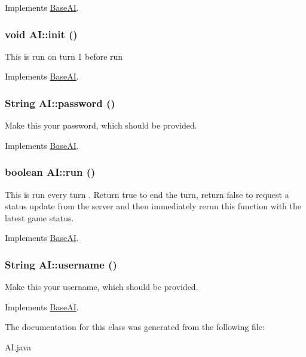 Implements \hyperlink{classBaseAI_afb1c3a00ed081e9efdfff9f7d1e6910d}{BaseAI}.

\hypertarget{classAI_a8c8e3a635791abaa61585357e6a25f63}{
\subsubsection[{init}]{\setlength{\rightskip}{0pt plus 5cm}void AI::init ()}}
\label{classAI_a8c8e3a635791abaa61585357e6a25f63}
This is run on turn 1 before run 

Implements \hyperlink{classBaseAI_a71b49f4ca248bfd32a9f9557cb6d494a}{BaseAI}.

\hypertarget{classAI_a405047fd39e03de993183392a06d655b}{
\subsubsection[{password}]{\setlength{\rightskip}{0pt plus 5cm}String AI::password ()}}
\label{classAI_a405047fd39e03de993183392a06d655b}
Make this your password, which should be provided. 

Implements \hyperlink{classBaseAI_a8607533e2b5bd9920ded593ae6509f48}{BaseAI}.

\hypertarget{classAI_af25b3a076daef2aaf9f74ecf458bdfbc}{
\subsubsection[{run}]{\setlength{\rightskip}{0pt plus 5cm}boolean AI::run ()}}
\label{classAI_af25b3a076daef2aaf9f74ecf458bdfbc}
This is run every turn . Return true to end the turn, return false to request a status update from the server and then immediately rerun this function with the latest game status. 

Implements \hyperlink{classBaseAI_a56c96a58c1f1e93d17f9817711a45594}{BaseAI}.

\hypertarget{classAI_ad7e6db6b414a192ad2af8656d012cfdc}{
\subsubsection[{username}]{\setlength{\rightskip}{0pt plus 5cm}String AI::username ()}}
\label{classAI_ad7e6db6b414a192ad2af8656d012cfdc}
Make this your username, which should be provided. 

Implements \hyperlink{classBaseAI_aa26770dd7db8dd0c4466dd770d4e05ba}{BaseAI}.



The documentation for this class was generated from the following file:\begin{DoxyCompactItemize}
\item 
AI.java\end{DoxyCompactItemize}
